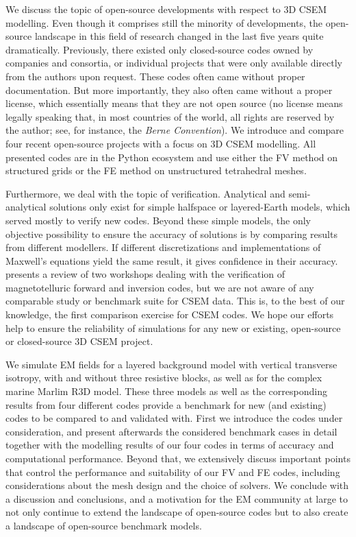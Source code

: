 \documentclass[
    paper,
  ]{geophysics}
\begin{document}
We discuss the topic of open-source developments with respect to 3D CSEM modelling. Even though it comprises still the minority of developments, the open-source landscape in this field of research changed in the last five years quite dramatically. Previously, there existed only closed-source codes owned by companies and consortia, or individual projects that were only available directly from the authors upon request. These codes often came without proper documentation. But more importantly, they also often came without a proper license, which essentially means that they are not open source (no license means legally speaking that, in most countries of the world, all rights are reserved by the author; see, for instance, the \emph{Berne Convention}). We introduce and compare four recent open-source projects with a focus on 3D CSEM modelling. All presented codes are in the Python ecosystem and use either the FV method on structured grids or the FE method on unstructured tetrahedral meshes.

Furthermore, we deal with the topic of verification. Analytical and semi-analytical solutions only exist for simple halfspace or layered-Earth models, which served mostly to verify new codes. Beyond these simple models, the only objective possibility to ensure the accuracy of solutions is by comparing results from different modellers. If different discretizations and implementations of Maxwell's equations yield the same result, it gives confidence in their accuracy. \cite{GJI.13.Miensopust} presents a review of two workshops dealing with the verification of magnetotelluric forward and inversion codes, but we are not aware of any comparable study or benchmark suite for CSEM data. This is, to the best of our knowledge, the first comparison exercise for CSEM codes. We hope our efforts help to ensure the reliability of simulations for any new or existing, open-source or closed-source 3D CSEM project.

We simulate EM fields for a layered background model with vertical transverse isotropy, with and without three resistive blocks, as well as for the complex marine Marlim R3D model. These three models as well as the corresponding results from four different codes provide a benchmark for new (and existing) codes to be compared to and validated with. First we introduce the codes under consideration, and present afterwards the considered benchmark cases in detail together with the modelling results of our four codes in terms of accuracy and computational performance. Beyond that, we extensively discuss important points that control the performance and suitability of our FV and FE codes, including considerations about the mesh design and the choice of solvers. We conclude with a discussion and conclusions, and a motivation for the EM community at large to not only continue to extend the landscape of open-source codes but to also create a landscape of open-source benchmark models.
\end{document}

